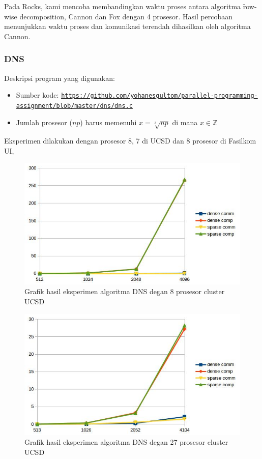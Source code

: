 Pada \cluster Rocks, kami mencoba membandingkan waktu proses antara algoritma \f{row-wise decomposition}, Cannon dan Fox dengan 4 prosesor. Hasil percobaan menunjukkan waktu proses dan komunikasi terendah dihasilkan oleh algoritma Cannon.

\subsubsection{DNS}

Deskripsi program yang digunakan:
\begin{itemize}
	\item Sumber kode: \texttt{\url{https://github.com/yohanesgultom/parallel-programming-assignment/blob/master/dns/dns.c}}
	\item Jumlah prosesor ($np$) harus memenuhi $x = \sqrt[3]{np}$ di mana $x \in \mathbb{Z}$
\end{itemize}

Eksperimen dilakukan dengan prosesor 8, 7 di \cluster UCSD dan 8 prosesor di \cluster Fasilkom UI,

\begin{figure}
	\centering
	\includegraphics[width=1\textwidth]
	{pics/chart_mm_dns_nbcr_8}
	\caption{Grafik hasil eksperimen algoritma DNS degan 8 prosesor cluster UCSD}
	\label{fig:result_dns_nbcr_8}
\end{figure}  

\begin{figure}
	\centering
	\includegraphics[width=1\textwidth]
	{pics/chart_mm_dns_nbcr_27}
	\caption{Grafik hasil eksperimen algoritma DNS degan 27 prosesor cluster UCSD}
	\label{fig:result_dns_nbcr_27}
\end{figure}  

